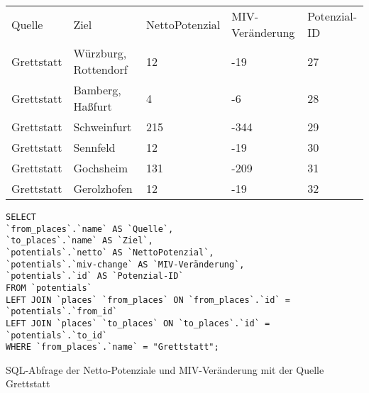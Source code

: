 \begin{tabularx}{\textwidth}{*5{X}}
Quelle & Ziel & NettoPotenzial & MIV-Veränderung & Potenzial-ID\\ 
Grettstatt & Würzburg, Rottendorf & 12 & -19 & 27\\ 
Grettstatt & Bamberg, Haßfurt & 4 & -6 & 28\\ 
Grettstatt & Schweinfurt & 215 & -344 & 29\\ 
Grettstatt & Sennfeld & 12 & -19 & 30\\ 
Grettstatt & Gochsheim & 131 & -209 & 31\\ 
Grettstatt & Gerolzhofen & 12 & -19 & 32\\ 
\end{tabularx}       
\newline
\newline
\begin{listing}[htbp]
\begin{verbatim}
SELECT
`from_places`.`name` AS `Quelle`, 
`to_places`.`name` AS `Ziel`, 
`potentials`.`netto` AS `NettoPotenzial`, 
`potentials`.`miv-change` AS `MIV-Veränderung`, 
`potentials`.`id` AS `Potenzial-ID`
FROM `potentials`
LEFT JOIN `places` `from_places` ON `from_places`.`id` = `potentials`.`from_id`
LEFT JOIN `places` `to_places` ON `to_places`.`id` = `potentials`.`to_id`
WHERE `from_places`.`name` = "Grettstatt";
\end{verbatim}
\caption{SQL-Abfrage der Netto-Potenziale und MIV-Veränderung mit der Quelle Grettstatt}\label{lst-fz-grettstatt}
\end{listing}
